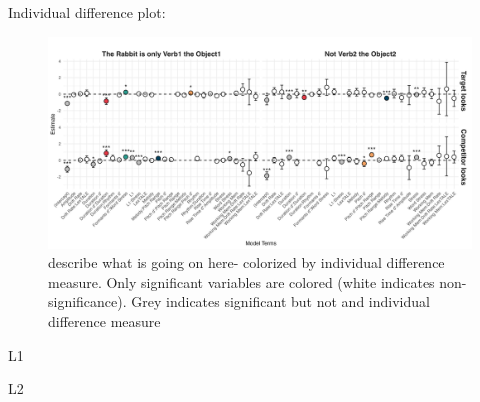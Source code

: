 Individual difference plot:


\begin{figure}[H]  %
    \centering
    \includegraphics[width=\textwidth,height=\textheight,keepaspectratio]{viz/id_gam_mod_out.png}
    \caption{describe what is going on here- colorized by individual difference measure. Only significant variables are colored (white indicates non-significance). Grey indicates significant but not and individual difference measure}
    \label{fig:id_gam_mod_out}
\end{figure}

L1 

L2


